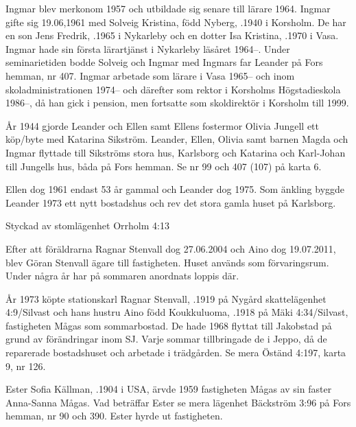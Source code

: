 Ingmar blev merkonom 1957 och utbildade sig senare till lärare 1964. Ingmar gifte sig 19.06,1961 med Solveig Kristina, född Nyberg, .1940 i Korsholm. De har en son Jens Fredrik, .1965 i Nykarleby och en dotter Isa Kristina, .1970 i Vasa. Ingmar hade sin första lärartjänst i Nykarleby läsåret 1964--. Under seminarietiden bodde Solveig och Ingmar med Ingmars far Leander på Fors hemman, nr 407. Ingmar arbetade som lärare i Vasa 1965-- och inom skoladministrationen 1974-- och därefter som rektor i Korsholms Högstadieskola 1986--, då han gick i pension, men fortsatte som skoldirektör i Korsholm till 1999.

År 1944 gjorde Leander och Ellen samt Ellens fostermor Olivia Jungell ett köp/byte med Katarina Sikström. Leander, Ellen, Olivia samt barnen Magda och Ingmar flyttade till Sikströms stora hus, Karlsborg och Katarina och Karl-Johan till Jungells hus, båda på Fors hemman. Se nr 99 och 407 (107) på karta 6.

Ellen dog 1961 endast 53 år gammal och Leander dog 1975. Som änkling byggde Leander 1973 ett nytt bostadshus och rev det stora gamla huset på Karlsborg.




Styckad av stomlägenhet Orrholm 4:13

Efter att föräldrarna Ragnar Stenvall dog 27.06.2004 och Aino	dog 19.07.2011, blev Göran Stenvall ägare till fastigheten. Huset används som förvaringsrum. Under några år har på sommaren anordnats loppis där.



År 1973 köpte stationskarl Ragnar Stenvall, .1919 på Nygård skattelägenhet 4:9/Silvast och hans hustru Aino född	Koukkuluoma, .1918 på Mäki 4:34/Silvast, fastigheten Mågas som sommarbostad. De hade 1968 flyttat till Jakobstad på grund av förändringar inom SJ. Varje sommar tillbringade de i Jeppo, då de reparerade bostadshuset och arbetade i trädgården. Se mera Öständ 4:197, karta 9, nr 126.


Ester Sofia Källman, .1904 i USA, ärvde 1959 fastigheten Mågas av sin faster Anna-Sanna Mågas. Vad beträffar Ester se mera lägenhet Bäckström 3:96 på Fors hemman, nr 90 och 390. Ester hyrde ut fastigheten.


